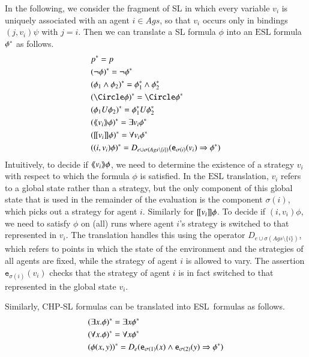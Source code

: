 \documentclass[a4wide]{article}
\newcommand{\ESL}{\mbox{ESL}}
\newcommand{\until}{U}
\theoremstyle{examplesty}
\newcommand{\strat}{\sigma}
\newcommand{\Ags}{\mathit{Ags}}
\newcommand{\atlop}[1]{\langle\hspace{-2pt}\langle #1 \rangle \hspace{-2pt}\rangle }
\newcommand{\lid}[2]{\mathtt{e}_{#1}(#2)}
\newcommand{\atluop}[1]{[\hspace{-1pt}[ #1]\hspace{-1pt}]}
\newcommand{\rimp}{\Rightarrow}
\newcommand{\nxt}{\Circle}
\begin{document}
In the following, we consider the fragment of SL in which 
every variable $v_i$ is uniquely associated with an agent $i\in\Ags$, so that $v_i$ occurs only in bindings $(j,v_i)\psi $ with $ j=i$. 
 Then we can 
translate a SL formula $\phi$ into an $\ESL$ formula $\phi^{*}$ as follows. 
\begin{align*} 
 & \trlsl{\assignedAgents}{p} = p \\
 &  \trlsl{\assignedAgents}{(\neg \phi)} = \neg \trlsl{\assignedAgents}{\phi} \\
 & \trlsl{\assignedAgents}{(\phi_1\land \phi_2)} = \trlsl{\assignedAgents}{\phi_1} \land \trlsl{\assignedAgents}{\phi_2} \\ 
 & \trlsl{\assignedAgents}{(\nxt \phi)} = \nxt \trlsl{\assignedAgents}{\phi} \\ 
 & \trlsl{\assignedAgents}{(\phi_1 \until \phi_2)} = \trlsl{\assignedAgents}{\phi_1} \until \trlsl{\assignedAgents}{\phi_2} \\
& \trlsl{\assignedAgents}{(\atlop{v_i}\phi)} = \exists v_i \trlsl{\assignedAgents}{\phi} \\
& \trlsl{\assignedAgents}{(\atluop{v_i}\phi)} = \forall v_i \trlsl{\assignedAgents}{\phi} \\
& \trlsl{\assignedAgents}{((i,v_i)\phi)} = D_{e\cup\strat(\Ags \setminus \{i\}) } ( \lid{\strat(i)}{v_i} \rimp  \trlsl{\assignedAgents}{\phi} ) \\
\end{align*} 
Intuitively, to decide if $\atlop{v_i}\phi$, we need to determine the existence of a
strategy $v_i$ with respect to 
which the formula $\phi$ is satisfied. 
In the $\ESL$ translation, $v_i$ refers to a global state rather than a strategy, but the only component of this global state that is used in 
the remainder of the evaluation is the component $\strat(i)$, which picks out a strategy for agent $i$. 
Similarly for $\atluop{v_i}\phi$. 
To decide if $(i,v_i)\phi$, we need to 
satisfy 
$\phi$ on 
(all) runs where agent $i$'s strategy is switched to that represented in $v_i$. 
The translation handles this using the operator $D_{e\cup\strat(\Ags \setminus \{i\}) } $, which 
refers to points in which the state of the environment and the strategies of all agents are fixed, 
while the strategy of agent $i$ is allowed to vary. The assertion $ \lid{\strat(i)}{v_i} $ checks that the
strategy of agent $i$ is in fact switched to that represented in the global state $v_i$. 

Similarly, CHP-SL formulas can be translated into \ESL\ formulas as follows. 
\begin{align*} 
& \trlsl{\assignedAgents}{(\exists x.\phi)} = \exists 
x 
\trlsl{\assignedAgents}{\phi} \\
& \trlsl{\assignedAgents}{(\forall x.\phi)} = \forall 
x
\trlsl{\assignedAgents}{\phi} \\
& \trlsl{\assignedAgents}{(\phi(x,y))} = D_{e} ( 
\lid{\strat(1)}{x}\land \lid{\strat(2)}{y} 
\rimp  \trlsl{\assignedAgents}{\phi} ) \\
\end{align*} 
\end{document}
